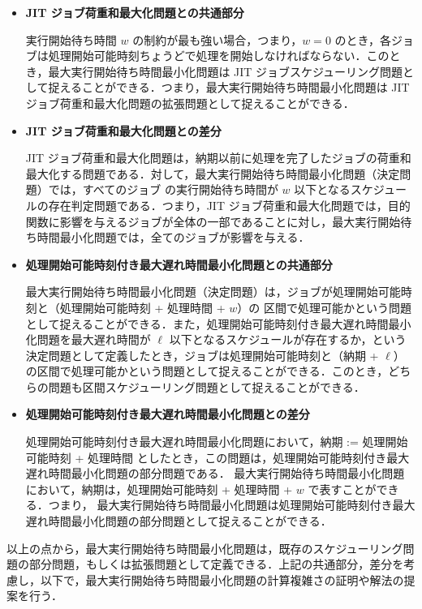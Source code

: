 \documentclass[12pt]{optlab-bachelor}
\begin{document}
\begin{itemize}
  \item \textbf{JIT ジョブ荷重和最大化問題との共通部分}

  実行開始待ち時間 $w$ の制約が最も強い場合，つまり，$w = 0$ のとき，各ジョブは処理開始可能時刻ちょうどで処理を開始しなければならない．このとき，最大実行開始待ち時間最小化問題は JIT ジョブスケジューリング問題として捉えることができる．つまり，最大実行開始待ち時間最小化問題は JIT ジョブ荷重和最大化問題の拡張問題として捉えることができる．

  \item \textbf{JIT ジョブ荷重和最大化問題との差分}

  JIT ジョブ荷重和最大化問題は，納期以前に処理を完了したジョブの荷重和
  最大化する問題である．対して，最大実行開始待ち時間最小化問題（決定問題）では，すべてのジョブ
  の実行開始待ち時間が $w$ 以下となるスケジュールの存在判定問題である．つまり，JIT ジョブ荷重和最大化問題では，目的関数に影響を与えるジョブが全体の一部であることに対し，最大実行開始待ち時間最小化問題では，全てのジョブが影響を与える．

  \item \textbf{処理開始可能時刻付き最大遅れ時間最小化問題との共通部分}

  最大実行開始待ち時間最小化問題（決定問題）は，ジョブが処理開始可能時刻と（処理開始可能時刻 + 処理時間 + $w$）の 区間で処理可能かという問題として捉えることができる．また，処理開始可能時刻付き最大遅れ時間最小化問題を最大遅れ時間が $\ell$ 以下となるスケジュールが存在するか，という決定問題として定義したとき，ジョブは処理開始可能時刻と（納期 + $\ell$）の区間で処理可能かという問題として捉えることができる．このとき，どちらの問題も区間スケジューリング問題として捉えることができる．

  \item \textbf{処理開始可能時刻付き最大遅れ時間最小化問題との差分}

  処理開始可能時刻付き最大遅れ時間最小化問題において，納期 := 処理開始可能時刻 + 処理時間 としたとき，この問題は，処理開始可能時刻付き最大遅れ時間最小化問題の部分問題である．
  最大実行開始待ち時間最小化問題において，納期は，処理開始可能時刻 + 処理時間 + $w$ で表すことができる．つまり，
  最大実行開始待ち時間最小化問題は処理開始可能時刻付き最大遅れ時間最小化問題の部分問題として捉えることができる．

\end{itemize}

以上の点から，最大実行開始待ち時間最小化問題は，既存のスケジューリング問題の部分問題，もしくは拡張問題として定義できる．上記の共通部分，差分を考慮し，以下で，最大実行開始待ち時間最小化問題の計算複雑さの証明や解法の提案を行う．
\end{document}
